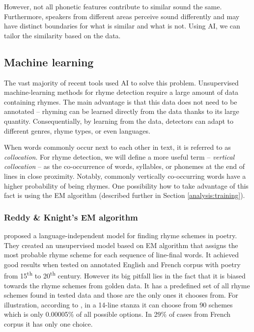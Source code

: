 However, not all phonetic features contribute to similar sound the same. Furthermore, speakers from different areas perceive sound differently and may have distinct boundaries for what is similar and what is not. Using AI, we can tailor the similarity based on the data.

\subsection{Machine learning}\label{ml}
The vast majority of recent tools used AI to solve this problem. Unsupervised machine-learning methods for rhyme detection require a large amount of data containing rhymes. The main advantage is that this data does not need to be annotated -- rhyming can be learned directly from the data thanks to its large quantity. Consequentially, by learning from the data, detectors can adapt to different genres, rhyme types, or even languages. 

When words commonly occur next to each other in text, it is referred to as \textit{collocation}. For rhyme detection, we will define a more useful term -- \textit{vertical collocation} -- as the co-occurrence of words, syllables, or phonemes at the end of lines in close proximity. Notably, commonly vertically co-occurring words have a higher probability of being rhymes. One possibility how to take advantage of this fact is using the EM algorithm (described further in Section \ref{analysis:training}).


\subsubsection*{Reddy \& Knight's EM algorithm}
\cite{reddy2011unsupervised} proposed a language-independent model for finding rhyme schemes in poetry. They created an unsupervised model based on EM algorithm that assigns the most probable rhyme scheme for each sequence of line-final words. It achieved good results when tested on annotated English and French corpus with poetry from 15\textsuperscript{th} to 20\textsuperscript{th} century. However its big pitfall lies in the fact that it is biased towards the rhyme schemes from golden data. It has a predefined set of all rhyme schemes found in tested data and those are the only ones it chooses from. For illustration, according to \cite{plechac2017presentation}, in a 14-line stanza it can choose from 90 schemes which is only 0.00005\% of all possible options. In 29\% of cases from French corpus it has only one choice.


